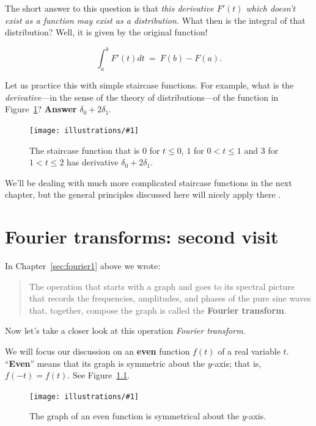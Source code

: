 \documentclass[openany]{book}
\newcommand{\ill}[3]{%
   \begin{figure}[H]%
   \vspace{-2ex}
   \centering%
   \texttt{[image: illustrations/\#1]}%
   \caption{#3}%
   \vspace{-2ex}
    \end{figure}}
\theoremstyle{plain}
\theoremstyle{definition}
\begin{document}
{The short answer to this question is that {\it this derivative $F'(t)$
  which doesn't exist as a function may exist as a distribution.}
What then is the integral of that distribution? Well, it is given by
the original function!

$$\int_a^bF'(t)dt \ = \ F(b) -F(a).$$

Let us practice this with simple staircase functions. For example,
what is the {\it derivative}---in the sense of the theory of
distributions---of the function in Figure~\ref{fig:simple_staircase}?
{\bf Answer} $\delta_0 + 2 \delta_1$.


\ill{simple_staircase}{.6}{The staircase function that is $0$ for $t
  \le 0$, $1$ for $0 <t \le 1$ and $3$ for $1< t \le 2$ has derivative
  $\delta_0 + 2\delta_1$.\label{fig:simple_staircase}}


We'll be dealing with much more complicated staircase functions in the
next chapter, but the general principles discussed here will nicely
apply there .


\chapter{Fourier transforms: second visit}

In Chapter~\ref{sec:fourier1} above we wrote:

\begin{quote} The operation that starts with a graph and goes to its
  spectral picture that records the frequencies, amplitudes, and
  phases of the pure sine waves that, together, compose the graph is
  called the {\bf Fourier transform}.
\end{quote}


  Now let's take a closer look at this operation {\it Fourier transform}.

  We will focus our discussion on an {\bf even} function $f(t)$ of a
  real variable $t$.  ``{\bf Even}'' means that its graph is symmetric
  about the $y$-axis; that is, $f(-t)= f(t)$.  See
  Figure~\ref{fig:even_function}.

  \ill{even_function}{.8}{The graph of an even function is symmetrical
    about the $y$-axis.\label{fig:even_function}}

}
\end{document}
